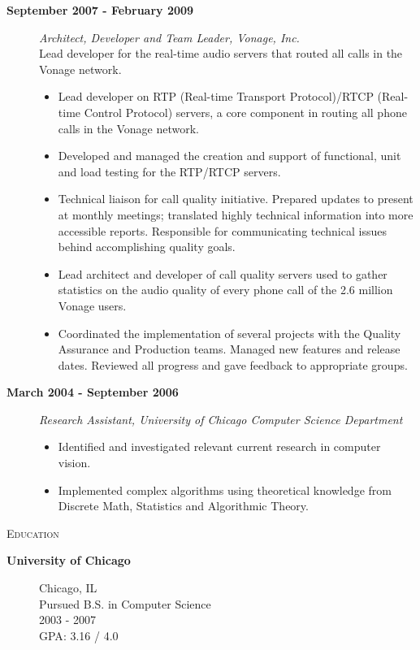 \documentclass[letter]{article}
\begin{document}
\begin{description}
\begin{description}
		\item [\textbf{September 2007 - February 2009}] \emph{Architect, Developer and Team Leader, Vonage, Inc.}
                  \\
                  Lead developer for the real-time audio servers that routed all calls in the Vonage network.
			\begin{itemize}
			 \item Lead developer on RTP (Real-time Transport Protocol)/RTCP (Real-time Control Protocol) servers, a core component in routing all phone calls in the Vonage network. 
			\item Developed and managed the creation and support of functional, unit and load testing for the RTP/RTCP servers. 
			\item Technical liaison for call quality initiative. Prepared updates to present at monthly meetings; translated highly technical information into more accessible reports. Responsible for communicating technical issues behind accomplishing quality goals. 
			\item Lead architect and developer of call quality servers used to gather statistics on the audio quality of every phone call of the 2.6 million Vonage users. 
			\item Coordinated the implementation of several projects with the Quality Assurance and Production teams. Managed new features and release dates. Reviewed all progress and gave feedback to appropriate groups. 
			\end{itemize}
		\item [\textbf{March 2004 - September 2006}] \emph{Research Assistant, University of Chicago Computer Science Department}
			\begin{itemize}
				\item Identified and investigated relevant current research in computer vision. 
				\item Implemented complex algorithms using theoretical knowledge from Discrete Math, Statistics and Algorithmic Theory. 
			\end{itemize}
          \end{description}

\vspace{7 mm} %
	\item \textsc{Education} 
	\begin{description}
			\item [\textbf{University of Chicago}] Chicago, IL \\
				Pursued B.S. in Computer Science \\
                                2003 - 2007 \\
				\textsc{GPA}: 3.16 / 4.0 \\
		\end{description}



\end{description}
\end{document}
